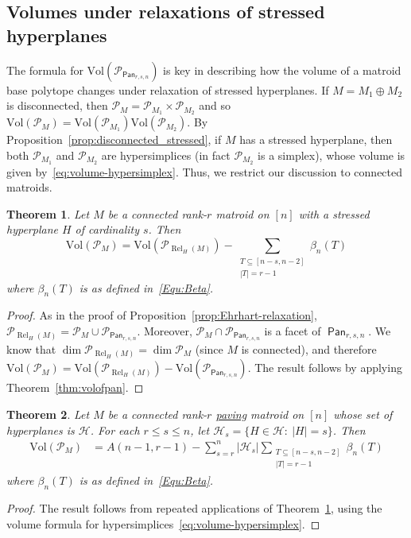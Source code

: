 \documentclass[11pt]{amsart}
\newtheorem{theorem}{Theorem}[section]
\theoremstyle{definition}
\newcommand{\0}{\emptyset}
\newcommand{\Po}{\mathcal{P}}
\newcommand{\Vol}{\mathrm{Vol}}
\DeclareMathOperator{\Rel}{Rel} %
\DeclareMathOperator{\Pan}{\mathsf{Pan}} %
\newcommand{\HH}{\mathcal{H}}
\begin{document}
\subsection{Volumes under relaxations of stressed hyperplanes} \label{volume-relax}

The formula for $\Vol(\Po_{\Pan_{r,s,n}})$ is key in describing how the volume of a matroid base polytope changes under relaxation of stressed hyperplanes. 
If $M=M_1\oplus M_2$ is disconnected, then $\Po_M=\Po_{M_1} \times \Po_{M_2}$ and so $\Vol(\Po_M) = \Vol(\Po_{M_1}) \Vol(\Po_{M_2})$.
By Proposition~\ref{prop:disconnected_stressed}, if $M$ has a stressed hyperplane, then both $\Po_{M_1}$ and $\Po_{M_2}$ are hypersimplices (in fact $\Po_{M_2}$ is a simplex), whose volume is given by~\eqref{eq:volume-hypersimplex}.
Thus, we restrict our discussion to connected matroids.

\begin{theorem}\label{thm:volume-relaxation}
Let $M$ be a connected rank-$r$ matroid on $[n]$ with a stressed hyperplane $H$ of cardinality $s$.
Then
\[\Vol(\Po_M) = \Vol(\Po_{\Rel_H(M)}) - \sum_{\substack{T \subseteq [n-s,n-2] \\ |T| = r-1}} \beta_n(T)\]
where $\beta_n(T)$ is as defined in~\eqref{Equ:Beta}.
\end{theorem}
\begin{proof}
As in the proof of Proposition~\ref{prop:Ehrhart-relaxation}, $\Po_{\Rel_H(M)} = \Po_{M} \cup \Po_{\Pan_{r,s,n}}$.
Moreover, $\Po_{M} \cap \Po_{\Pan_{r,s,n}}$ is a facet of $\Pan_{r,s,n}$.
We know that $\dim \Po_{\Rel_H(M)} =\dim\Po_M$ (since $M$ is connected), and therefore $\Vol(\Po_{M}) = \Vol(\Po_{\Rel_H(M)}) - \Vol(\Po_{\Pan_{r,s,n}})$.
The result follows by applying Theorem~\ref{thm:volofpan}.
\end{proof}

\begin{theorem} \label{thm:volume-paving}
Let $M$ be a connected rank-$r$ \underline{paving} matroid on $[n]$ whose set of hyperplanes is $\HH$.
For each $r \leq s \leq n$, let $\HH_s=\{H\in\HH:\ |H|=s\}$.
Then
\begin{align*}
\Vol(\Po_M)
&= A(n-1,r-1) - \sum_{s=r}^n |\HH_s| \sum_{\substack{T \subseteq [n-s,n-2] \\ |T| = r-1}} \beta_n(T)
\end{align*}
where $\beta_n(T)$ is as defined in~\eqref{Equ:Beta}.
\end{theorem}

\begin{proof}
The result follows from repeated applications of Theorem~\ref{thm:volume-relaxation}, using the volume formula for hypersimplices~\eqref{eq:volume-hypersimplex}.
\end{proof}
\end{document}
